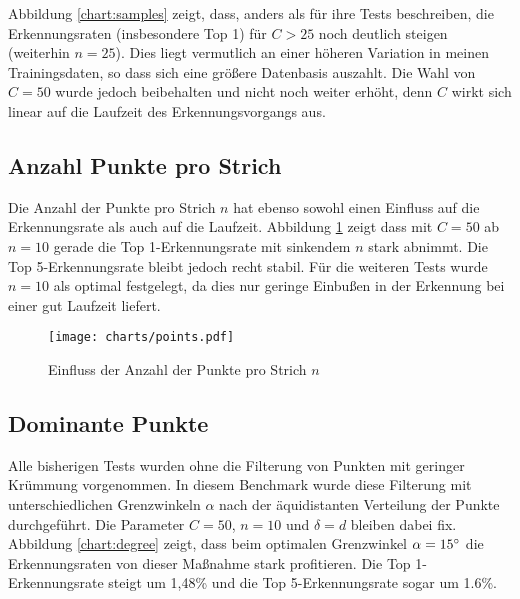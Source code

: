 Abbildung \ref{chart:samples} zeigt, dass, anders als \citet{Golubitsky:2009p1842} für ihre Tests beschreiben, die Erkennungsraten (insbesondere Top 1) für $C > 25$ noch deutlich steigen (weiterhin $n=25$). Dies liegt vermutlich an einer höheren Variation in meinen Trainingsdaten, so dass sich eine größere Datenbasis auszahlt. Die Wahl von $C=50$ wurde jedoch beibehalten und nicht noch weiter erhöht, denn $C$ wirkt sich linear auf die Laufzeit des Erkennungsvorgangs aus.

\subsection{Anzahl Punkte pro Strich} %
\label{sub:anzahl_punkte_pro_strich}

Die Anzahl der Punkte pro Strich $n$ hat ebenso sowohl einen Einfluss auf die Erkennungsrate als auch auf die Laufzeit. Abbildung \ref{chart:points} zeigt dass mit $C=50$ ab $n=10$ gerade die Top 1-Erkennungsrate mit sinkendem $n$ stark abnimmt. Die Top 5-Erkennungsrate bleibt jedoch recht stabil. Für die weiteren Tests wurde $n=10$ als optimal festgelegt, da dies nur geringe Einbußen in der Erkennung bei einer gut Laufzeit liefert.

\begin{figure}[htbp]
  \begin{center}
    \texttt{[image: charts/points.pdf]}
  \end{center}
  \caption{Einfluss der Anzahl der Punkte pro Strich $n$}
  \label{chart:points}
\end{figure}


\subsection{Dominante Punkte} %
\label{sub:dominante_punkte}

Alle bisherigen Tests wurden ohne die Filterung von Punkten mit geringer Krümmung vorgenommen. In diesem Benchmark wurde diese Filterung mit unterschiedlichen Grenzwinkeln $\alpha$ nach der äquidistanten Verteilung der Punkte durchgeführt. Die Parameter $C=50$, $n=10$ und $\delta=d$ bleiben dabei fix. Abbildung \ref{chart:degree} zeigt, dass beim optimalen Grenzwinkel $\alpha=15\degree$ die Erkennungsraten von dieser Maßnahme stark profitieren. Die Top 1-Erkennungsrate steigt um 1,48\% und die Top 5-Erkennungsrate sogar um 1.6\%.

